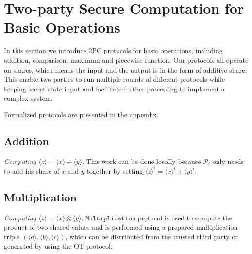 \documentclass[letterpaper]{article} %
\begin{document}


    \section{Two-party Secure Computation for Basic Operations}

    In this section we introduce 2PC protocols for basic operations,
    including addition, comparison, maximum and piecewise function.
    Our protocols all operate on shares, which means
    the input and the output is in the form of additive share.
    This enable two parties to run multiple rounds of different
    protocols while keeping secret state input
    and facilitate further processing to implement a complex system.

    Formalized protocols are presented in the appendix.

    \subsection{Addition}

    \emph{Computing} $ \langle z\rangle  = \langle x\rangle  + \langle y\rangle $. This work can be done locally because
    $\mathcal{P}_{i}$ only needs to add his share of $x$ and $y$ together by setting $\langle z\rangle^{i}  = \langle x\rangle^{i}  + \langle y\rangle^{i} $.



    \subsection{Multiplication}
    \emph{Computing} $ \langle z\rangle  = \langle x\rangle  \otimes \langle y\rangle $.
    $\mathtt{Multiplication}$ protocol is used to compute the product of two shared values and is performed
    using a prepared multiplication triple $(\langle a\rangle,\langle b\rangle,\langle c\rangle)$,
    which can be distributed from the trusted third party or
    generated by using the OT protocol.
\end{document}
